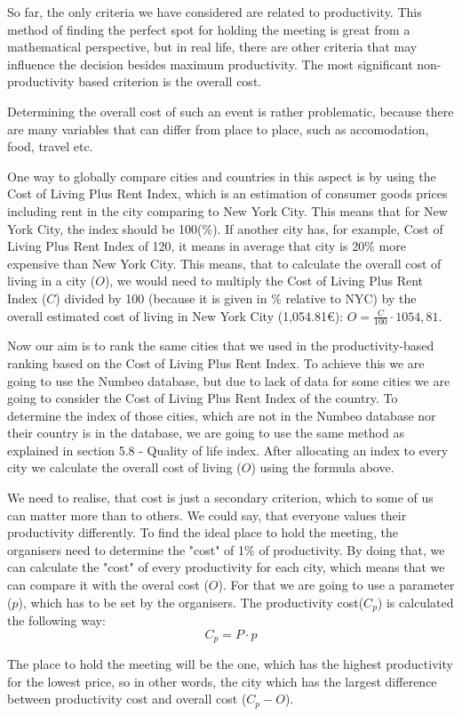 
So far, the only criteria we have considered are related to productivity. This method of finding the perfect spot for holding the meeting is great from a mathematical perspective, but in real life, there are other criteria that may influence the decision besides maximum productivity. The most significant non-productivity based criterion is the overall cost.

Determining the overall cost of such an event is rather problematic, because there are many variables that can differ from place to place, such as accomodation, food, travel etc.

One way to globally compare cities and countries in this aspect is by using the Cost of Living Plus Rent Index, which is an estimation of consumer goods prices including rent in the city comparing to New York City. This means that for New York City, the index should be 100(\%). If another city has, for example, Cost of Living Plus Rent Index of 120, it means in average that city is 20\% more expensive than New York City. This means, that to calculate the overall cost of living in a city ($O$), we would need to multiply the Cost of Living Plus Rent Index ($C$) divided by 100 (because it is given in $\%$ relative to NYC) by the overall estimated cost of living in New York City (1,054.81€): $O=\frac{C}{100}\cdot 1054,81$.
 
Now our aim is to rank the same cities that we used in the productivity-based ranking based on the Cost of Living Plus Rent Index. To achieve this we are going to use the Numbeo database, but due to lack of data for some cities we are going to consider the Cost of Living Plus Rent Index of the country. To determine the index of those cities, which are not in the Numbeo database nor their country is in the database, we are going to use the same method as explained in section 5.8 - Quality of life index. After allocating an index to every city we calculate the overall cost of living ($O$) using the formula above. 

We need to realise, that cost is just a secondary criterion, which to some of us can matter more than to others. We could say, that everyone values their productivity differently. To find the ideal place to hold the meeting, the organisers need to determine the "cost" of 1\% of productivity. By doing that, we can calculate the "cost" of every productivity for each city, which means that we can compare it with the overal cost ($O$). For that we are going to use a parameter ($p$), which has to be set by the organisers. The productivity cost($C_p$) is calculated  the following way:
$$C_p=P\cdot p$$

The place to hold the meeting will be the one, which has the highest productivity for the lowest price, so in other words, the city which has the largest difference between productivity cost and overall cost ($C_p-O$).

